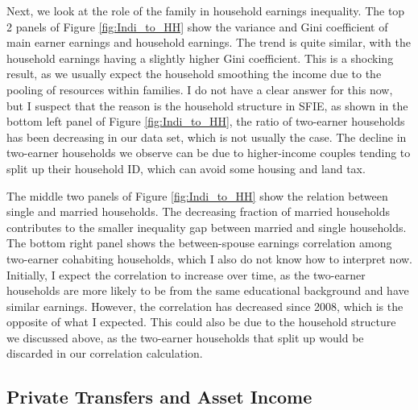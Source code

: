 \documentclass{article}
\begin{document}
Next, we look at the role of the family in household earnings inequality. The top 2 panels of Figure \ref{fig:Indi_to_HH} show the variance and Gini coefficient of main earner earnings and household earnings. The trend is quite similar, with the household earnings having a slightly higher Gini coefficient. This is a shocking result, as we usually expect the household smoothing the income due to the pooling of resources within families. I do not have a clear answer for this now, but I suspect that the reason is the household structure in SFIE, as shown in the bottom left panel of Figure \ref{fig:Indi_to_HH}, the ratio of two-earner households has been decreasing in our data set, which is not usually the case. The decline in two-earner households we observe can be due to higher-income couples tending to split up their household ID, which can avoid some housing and land tax.

The middle two panels of Figure \ref{fig:Indi_to_HH} show the relation between single and married households. The decreasing fraction of married households contributes to the smaller inequality gap between married and single households. The bottom right panel shows the between-spouse earnings correlation among two-earner cohabiting households, which I also do not know how to interpret now. Initially, I expect the correlation to increase over time, as the two-earner households are more likely to be from the same educational background and have similar earnings. However, the correlation has decreased since 2008, which is the opposite of what I expected. This could also be due to the household structure we discussed above, as the two-earner households that split up would be discarded in our correlation calculation.

\subsection{Private Transfers and Asset Income}
\end{document}
